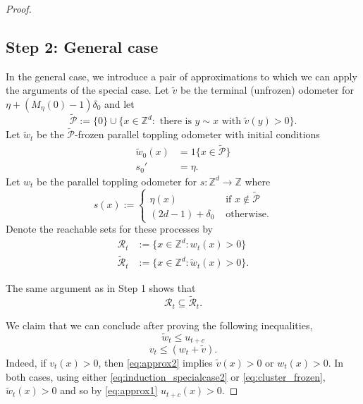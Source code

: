 \documentclass[aap]{imsart}
\newcommand{\Z}{\mathbb{Z}}
\begin{document}
\begin{proof}
	\subsection*{Step 2: General case}
	In the general case, we introduce a pair of approximations to which we can apply the arguments of the special case. Let $\tilde{v}$ be the terminal (unfrozen) odometer for $\eta + (M_{\eta}(0)-1)  \delta_0$ and let
	\begin{equation} \label{eq:penultimate_touched}
	\tilde{\mathcal{P}} := \{0\} \cup \{ x \in \Z^d : \mbox{ there is $y \sim x$ with $\tilde{v}(y) > 0 $}\}.
	\end{equation}
	Let $\tilde{w}_t$ be the $\tilde{\mathcal{P}}$-frozen parallel toppling odometer with initial conditions  
	\begin{equation} \label{eq:cluster_frozen}
	\begin{aligned}
	\tilde{w}_0(x) &= 1 \{ x \in \tilde{\mathcal{P}} \} \\
	s_0' &= \eta.
	\end{aligned}
	\end{equation}
	Let $w_t$ be the parallel toppling odometer for $s: \Z^d \to \Z$ where 
	\begin{equation}
	s(x) := 
	\begin{cases}
	\eta(x) &\mbox{ if $x \not \in \tilde{\mathcal{P}}$}  \\
	(2 d - 1) + \delta_0  &\mbox{ otherwise}.
	\end{cases}
	\end{equation}
	Denote the reachable sets for these processes by
	\begin{equation}
	\begin{aligned} 
	\mathcal{R}_t &:= \{ x \in \Z^d : w_t(x) > 0 \} \\
	\tilde{\mathcal{R}}_t &:= \{x \in \Z^d : \tilde{w}_t(x) > 0\}.
	\end{aligned}
	\end{equation}
	
	The same argument as in Step 1 shows that
	\begin{equation} \label{eq:induction_specialcase2}
	\mathcal{R}_t \subseteq \tilde{\mathcal{R}}_t.
	\end{equation}
	
	We claim that we can conclude after proving the following inequalities, 
	\begin{equation} \label{eq:approx1}
	\tilde{w}_t \leq u_{t + c}
	\end{equation}
	\begin{equation} \label{eq:approx2}
	v_{t} \leq \left( w_{t} + \tilde{v}\right).
	\end{equation}
	Indeed, if $v_t(x) > 0$, then \eqref{eq:approx2} implies $\tilde{v}(x) > 0$ or $w_{t}(x) > 0$. In both cases, 
	using either \eqref{eq:induction_specialcase2} or \eqref{eq:cluster_frozen},
	$\tilde{w}_t(x) > 0$ and so by \eqref{eq:approx1} $u_{t+c}(x) > 0$.
	

\end{proof}
\end{document}
